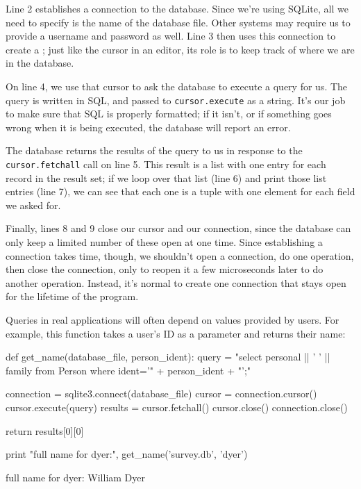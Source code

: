 Line 2 establishes a connection to the database. Since we're using
SQLite, all we need to specify is the name of the database file. Other
systems may require us to provide a username and password as well. Line
3 then uses this connection to create a ;
just like the cursor in an editor, its role is to keep track of where we
are in the database.

On line 4, we use that cursor to ask the database to execute a query for
us. The query is written in SQL, and passed to \texttt{cursor.execute}
as a string. It's our job to make sure that SQL is properly formatted;
if it isn't, or if something goes wrong when it is being executed, the
database will report an error.

The database returns the results of the query to us in response to the
\texttt{cursor.fetchall} call on line 5. This result is a list with one
entry for each record in the result set; if we loop over that list (line
6) and print those list entries (line 7), we can see that each one is a
tuple with one element for each field we asked for.

Finally, lines 8 and 9 close our cursor and our connection, since the
database can only keep a limited number of these open at one time. Since
establishing a connection takes time, though, we shouldn't open a
connection, do one operation, then close the connection, only to reopen
it a few microseconds later to do another operation. Instead, it's
normal to create one connection that stays open for the lifetime of the
program.

Queries in real applications will often depend on values provided by
users. For example, this function takes a user's ID as a parameter and
returns their name:

\begin{VerbIn}
def get_name(database_file, person_ident):
    query = "select personal || ' ' || family from Person where ident='" + person_ident + "';"

    connection = sqlite3.connect(database_file)
    cursor = connection.cursor()
    cursor.execute(query)
    results = cursor.fetchall()
    cursor.close()
    connection.close()

    return results[0][0]

print "full name for dyer:", get_name('survey.db', 'dyer')
\end{VerbIn}

\begin{VerbOut}
full name for dyer: William Dyer
\end{VerbOut}


